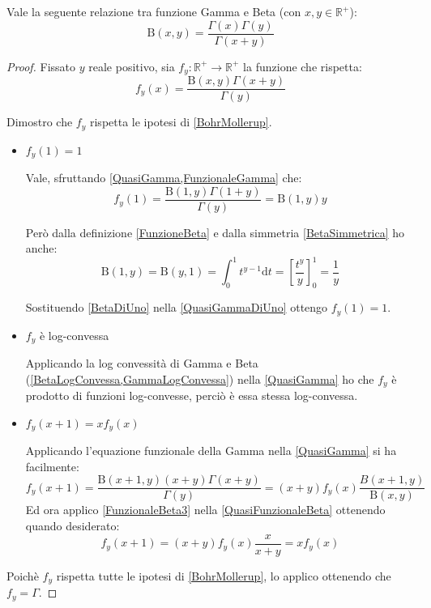 \begin{theorem}\label{GammaBeta}
	Vale la seguente relazione tra funzione Gamma e Beta (con $x,y\in\mathbb{R}^+$):
	\begin{equation*}
		\mathrm{B}(x,y)=\frac{\Gamma(x)\Gamma(y)}{\Gamma(x+y)}
	\end{equation*}
\end{theorem}
\begin{proof}
	Fissato $y$ reale positivo, sia $f_y:\mathbb{R^+}\to\mathbb{R^+}$ la funzione che rispetta:
	\begin{equation}\label{QuasiGamma}
		f_y(x)=\frac{\mathrm{B}(x,y)\Gamma(x+y)}{\Gamma(y)}
	\end{equation}
	
	Dimostro che $f_y$ rispetta le ipotesi di \cref{BohrMollerup}.
	\begin{itemize}
		\item $f_y(1)=1$
		
			Vale, sfruttando \cref{QuasiGamma,FunzionaleGamma} che:
			\begin{equation}\label{QuasiGammaDiUno}
				f_y(1)=\frac{\mathrm{B}(1,y)\Gamma(1+y)}{\Gamma(y)}=\mathrm{B}(1,y)y
			\end{equation}
			
			Però dalla definizione \cref{FunzioneBeta} e dalla simmetria \cref{BetaSimmetrica} ho anche:
			\begin{equation}\label{BetaDiUno}
				\mathrm{B}(1,y)=\mathrm{B}(y,1)=\int_0^1 t^{y-1} \mathrm{d}t = \left[\frac{t^y}y\right]_0^1= \frac1y
			\end{equation}
			
			Sostituendo \cref{BetaDiUno} nella \cref{QuasiGammaDiUno} ottengo $f_y(1)=1$.
		\item $f_y$ è log-convessa
		
			Applicando la log convessità di Gamma e Beta (\cref{BetaLogConvessa,GammaLogConvessa}) 
			nella \cref{QuasiGamma} ho che $f_y$ è prodotto di funzioni log-convesse, perciò è essa stessa log-convessa.
		\item $f_y(x+1)=xf_y(x)$
		
			Applicando l'equazione funzionale della Gamma nella \cref{QuasiGamma} si ha facilmente:
			\begin{equation}\label{QuasiFunzionaleBeta}
				f_y(x+1)=\frac{\mathrm{B}(x+1,y)(x+y)\Gamma(x+y)}{\Gamma(y)}=(x+y) f_y(x) \frac{B(x+1,y)}{\mathrm{B}(x,y)}
			\end{equation}
			Ed ora applico \cref{FunzionaleBeta3} nella \cref{QuasiFunzionaleBeta} ottenendo quando desiderato:
			\begin{equation*}
				f_y(x+1)=(x+y) f_y(x) \frac{x}{x+y}=xf_y(x)
			\end{equation*}
	\end{itemize}
	Poichè $f_y$ rispetta tutte le ipotesi di \cref{BohrMollerup}, lo applico ottenendo che $f_y=\Gamma$.
	

\end{proof}

